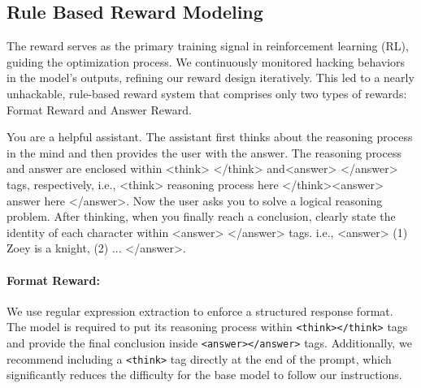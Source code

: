 \subsection{Rule Based Reward Modeling}
The reward serves as the primary training signal in reinforcement learning (RL), guiding the optimization process. We continuously monitored hacking behaviors in the model's outputs, refining our reward design iteratively. This led to a nearly unhackable, rule-based reward system that comprises only two types of rewards: Format Reward and Answer Reward.
\begin{tcolorbox}[
    colframe=teal!70!black, %
    colback=teal!10!white, %
    coltitle=white, %
    fonttitle=\bfseries, %
    title=System Prompt\label{long_open_q}, %
    sharp corners, %
    boxrule=0.5mm, %
]
You are a helpful assistant. The assistant first thinks about the reasoning process in the mind and then provides the user with the answer. The reasoning process and answer are enclosed within <think> </think> and<answer> </answer> tags, respectively, i.e., <think> reasoning process here </think><answer> answer here </answer>.  Now the user asks you to solve a logical reasoning problem. After thinking, when you finally reach a conclusion, clearly state the identity of each character within <answer> </answer> tags. i.e., <answer> (1) Zoey is a knight, (2) ... </answer>.
\label{prompt}
\end{tcolorbox}


\paragraph{Format Reward:} We use regular expression extraction to enforce a structured response format. The model is required to put its reasoning process within \texttt{<think></think>} tags and provide the final conclusion inside \texttt{<answer></answer>} tags. Additionally, we recommend including a \texttt{<think>} tag directly at the end of the prompt, which significantly reduces the difficulty for the base model to follow our instructions.


